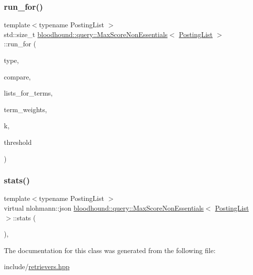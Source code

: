 \subsubsection{\texorpdfstring{run\+\_\+for()}{run\_for()}}
{\footnotesize\ttfamily template$<$typename Posting\+List $>$ \\
std\+::size\+\_\+t \hyperlink{classbloodhound_1_1query_1_1MaxScoreNonEssentials}{bloodhound\+::query\+::\+Max\+Score\+Non\+Essentials}$<$ \hyperlink{classbloodhound_1_1PostingList}{Posting\+List} $>$\+::run\+\_\+for (\begin{DoxyParamCaption}\item[{std\+::string}]{type,  }\item[{bool($\ast$)(const \hyperlink{classbloodhound_1_1PostingList}{Posting\+List} \&, const \hyperlink{classbloodhound_1_1PostingList}{Posting\+List} \&)}]{compare,  }\item[{std\+::vector$<$ \hyperlink{classbloodhound_1_1PostingList}{Posting\+List} $>$ \&}]{lists\+\_\+for\+\_\+terms,  }\item[{const std\+::vector$<$ \hyperlink{structbloodhound_1_1Score}{Score} $>$ \&}]{term\+\_\+weights,  }\item[{std\+::size\+\_\+t}]{k,  }\item[{\hyperlink{structbloodhound_1_1Score}{Score}}]{threshold }\end{DoxyParamCaption})\hspace{0.3cm}{\ttfamily [inline]}}

\mbox{\label{classbloodhound_1_1query_1_1MaxScoreNonEssentials_afb9b4ca76cca49d32ba584555d0b91fe}} 
\subsubsection{\texorpdfstring{stats()}{stats()}}
{\footnotesize\ttfamily template$<$typename Posting\+List $>$ \\
virtual nlohmann\+::json \hyperlink{classbloodhound_1_1query_1_1MaxScoreNonEssentials}{bloodhound\+::query\+::\+Max\+Score\+Non\+Essentials}$<$ \hyperlink{classbloodhound_1_1PostingList}{Posting\+List} $>$\+::stats (\begin{DoxyParamCaption}{ }\end{DoxyParamCaption})\hspace{0.3cm}{\ttfamily [inline]}, {\ttfamily [virtual]}}



The documentation for this class was generated from the following file\+:\begin{DoxyCompactItemize}
\item 
include/\hyperlink{retrievers_8hpp}{retrievers.\+hpp}\end{DoxyCompactItemize}
